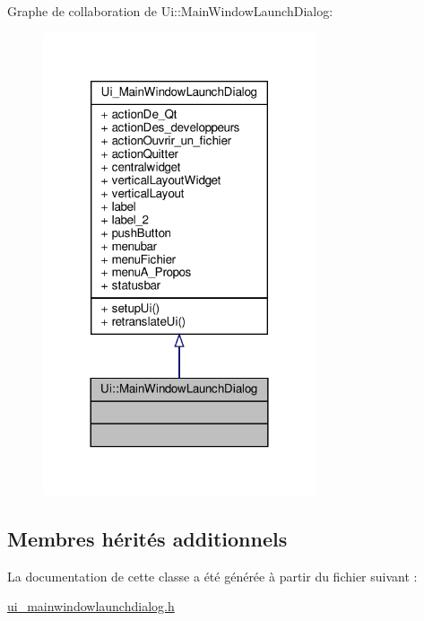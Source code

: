 Graphe de collaboration de Ui\+:\+:Main\+Window\+Launch\+Dialog\+:\nopagebreak
\begin{figure}[H]
\begin{center}
\leavevmode
\includegraphics[width=228pt]{classUi_1_1MainWindowLaunchDialog__coll__graph}
\end{center}
\end{figure}
\subsection*{Membres hérités additionnels}


La documentation de cette classe a été générée à partir du fichier suivant \+:\begin{DoxyCompactItemize}
\item 
\hyperlink{ui__mainwindowlaunchdialog_8h}{ui\+\_\+mainwindowlaunchdialog.\+h}\end{DoxyCompactItemize}
